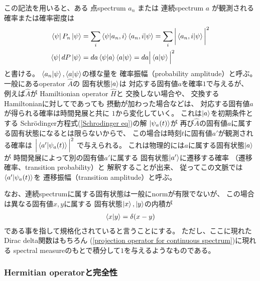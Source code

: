 この記法を用いると、ある
点spectrum $a_n$
または
連続spectrum $a$
が観測される確率または確率密度は
\begin{subequations}
\begin{align}
    \bra{ \psi }
        P_n
    \ket{ \psi }
    &=
    \sum_i
    \braket{ \psi | a_n, i }
    \braket{ a_n, i | \psi }
    =
    \sum_i
    \bigg|
        \braket{ a_n, i | \psi }
    \bigg|^2
\\
    \bra{ \psi }
        d P
    \ket{ \psi }
    &=
    d a
    \braket{ \psi | a }
    \braket{ a | \psi }
    =
    d a
    \Big|
        \braket{ a | \psi }
    \Big|^2
\end{align}
\end{subequations}
と書ける。
$\braket{ a_n | \psi },
\braket{ a | \psi }$の様な量を
確率振幅（probability amplitude）と呼ぶ。
一般にあるoperator $\hat{A}$の
固有状態$\ket{a}$は
対応する固有値$a$を確率$1$で与えるが、
例えば$\hat{A}$が
Hamiltionian operator $\hat{H}$と
交換しない場合や、
交換するHamiltonianに対してであっても
摂動が加わった場合などは、
対応する固有値$a$が得られる確率は時間発展と共に
$1$から変化していく。
これは$\ket{a}$を初期条件とする
Schr\"odinger方程式(\ref{Schrodinger eq})の解
$\ket{\psi_a(t)}$が
再び$\hat{A}$の固有値$a$に属する固有状態になるとは限らないからで、
この場合は時刻$t$に固有値$a'$が観測される確率は
$\Big| \braket{ a' | \psi_a(t) } \Big|^2$
で与えられる。
これは物理的には$a$に属する固有状態$\ket{a}$が
時間発展によって別の固有値$a'$に属する
固有状態$\ket{a'}$に遷移する確率
（遷移確率、transition probability）と
解釈することが出来、
従ってこの文脈では
$\braket{ a' | \psi_a(t) }$を
遷移振幅（transition amplitude）と呼ぶ。

なお、連続spectrumに属する固有状態は一般にnormが有限でないが、
この場合は異なる固有値$x, y$に属する
固有状態$\ket{x}, \ket{y}$の内積が
\begin{align}
    \braket{x|y} = \delta(x-y)
\label{continuous spectrum normalization}
\end{align}
である事を指して規格化されていると言うことにする。
ただし、ここに現れたDirac delta関数はもちろん
(\ref{projection operator for continuous spectrum})に現れる
spectral measureのもとで積分して$1$を与えるようなものである。

\subsubsection{Hermitian operatorと完全性}

